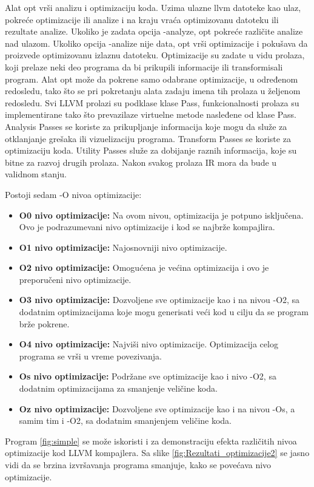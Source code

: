\documentclass[a4paper]{article}
\begin{document}
Alat opt vrši analizu i optimizaciju koda. Uzima ulazne llvm datoteke kao ulaz, pokreće optimizacije ili analize i na kraju vraća optimizovanu datoteku ili rezultate analize. Ukoliko je zadata opcija -analyze, opt pokreće različite analize nad ulazom. Ukoliko opcija  -analize nije data, opt vrši optimizacije i pokušava da proizvede optimizovanu izlaznu datoteku. Optimizacije su zadate u vidu prolaza, koji prelaze neki deo programa da bi prikupili informacije ili transformisali program. Alat opt može da pokrene samo odabrane optimizacije, u određenom redosledu, tako što se pri pokretanju alata zadaju imena tih prolaza u željenom redosledu. Svi LLVM prolazi su podklase klase Pass, funkcionalnosti prolaza su implementirane tako što prevazilaze virtuelne metode nasleđene od klase Pass. Analysis Passes se koriste za prikupljanje informacija koje mogu da služe za otklanjanje grešaka ili vizuelizaciju programa. Transform Passes se koriste za optimizaciju koda. Utility Passes služe za dobijanje raznih informacija, koje su bitne za razvoj drugih prolaza. Nakon svakog prolaza IR mora da bude u validnom stanju.

Postoji sedam -O nivoa optimizacije: 
\begin{itemize}
\item \textbf{O0 nivo optimizacije:} Na ovom nivou, optimizacija je potpuno isključena. Ovo je podrazumevani nivo optimizacije i kod se najbrže kompajlira.
\item \textbf{O1 nivo optimizacije:} Najosnovniji nivo optimizacije.
\item \textbf{O2 nivo optimizacije:} Omogućena je većina optimizacija i ovo je preporučeni nivo optimizacije.
\item \textbf{O3 nivo optimizacije:} Dozvoljene sve optimizacije kao i na nivou -O2, sa dodatnim optimizacijama koje mogu generisati veći kod u cilju da se program brže pokrene.
\item \textbf{O4 nivo optimizacije:} Najviši nivo optimizacije. Optimizacija celog programa se vrši u vreme povezivanja. 
\item \textbf{Os nivo optimizacije:} Podržane sve optimizacije kao i nivo -O2, sa dodatnim optimizacijama za smanjenje veličine koda.
\item \textbf{Oz nivo optimizacije:} Dozvoljene sve optimizacije kao i na nivou -Os, a samim tim i -O2,  sa dodatnim smanjenjem veličine koda. \cite{opt} \cite{pass} \cite{pass2}
\end{itemize}

Program \ref{fig:simple} se može iskoristi i za demonstraciju efekta različitih nivoa optimizacije kod LLVM kompajlera. Sa slike \ref{fig:Rezultati_optimizacije2} se jasno vidi da se brzina izvršavanja programa smanjuje, kako se povećava nivo optimizacije.
\end{document}
